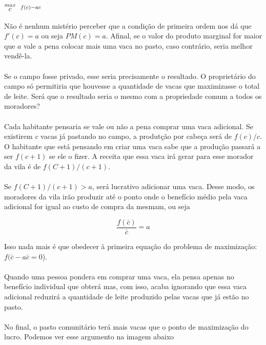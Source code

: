 \documentclass[a4paper,11pt,oneside]{book}
\theoremstyle{definition}
\theoremstyle{break}
\begin{document}
\begin{center}
	\LARGE $ \stackrel{max}{\text{\small $c$}} \ \ %
	\stackrel{f(c) - ac}{\ } $ %
\end{center}

Não é nenhum mistério perceber que a condição de primeira ordem nos dá que $f'(c) = a$ ou seja $PM(c) = a$. Afinal, se o valor do produto marginal for maior que $a$ vale a pena colocar mais uma vaca no pasto, caso contrário, seria melhor vendê-la.
\\
\\
Se o campo fosse privado, esse seria precisamente o resultado. O proprietário do campo só permitiria que houvesse a quantidade de vacas que maximizasse o total de leite. Será que o resultado seria o mesmo com a propriedade comum a todos os moradores?
\\
\\
Cada habitante pensaria se vale ou não a pena comprar uma vaca adicional. Se existirem $c$ vacas já pastando no campo, a produtção por cabeça será de $f(c)/c$. O habitante que está pensando em criar uma vaca sabe que a produção passará a ser $f(c+1)$ se ele o fizer. A receita que essa vaca irá gerar para esse morador da vila é de $f(C+1)/(c+1)$.
\\
\\
Se $f(C+1)/(c+1) > a$, será lucrativo adicionar uma vaca. Desse modo, os moradores da vila irão produzir até o ponto onde o benefício médio pela vaca adicional for igual ao custo de compra da mesmam, ou seja

$$ \frac{f(\bar{c})}{\bar{c}} = a $$

Isso nada mais é que obedecer à primeira equação do problema de maximização: $f(\bar{c} - a\bar{c} = 0$).
\\
\\
Quando uma pessoa pondera em comprar uma vaca, ela pensa apenas no benefício individual que obterá mas, com isso, acaba ignorando que essa vaca adicional reduzirá a quantidade de leite produzido pelas vacas que já estão no pasto.
\\
\\
No final, o pasto comunitário terá mais vacas que o ponto de maximização do lucro. Podemos ver esse argumento na imagem abaixo
\end{document}

